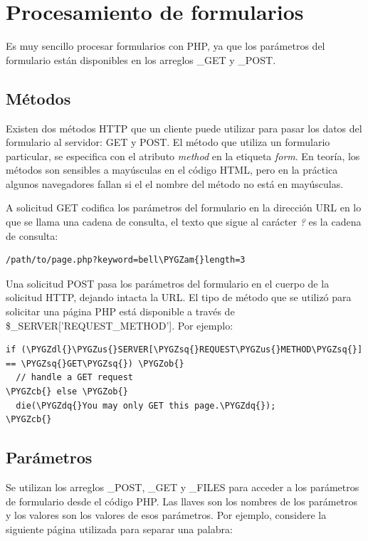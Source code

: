 \documentclass[a5paper,10pt,spanish]{sphinxmanual}
\def\PYGZus{\char`\_}
\def\PYGZob{\char`\{}
\def\PYGZcb{\char`\}}
\def\PYGZam{\char`\&}
\def\PYGZdl{\char`\$}
\def\PYGZsq{\char`\'}
\def\PYGZdq{\char`\"}
\begin{document}
\section{Procesamiento de formularios}
\label{Tutorial2_Formularios.md::doc}\label{Tutorial2_Formularios.md:procesamiento-de-formularios}
Es muy sencillo procesar formularios con PHP, ya que los parámetros del
formulario están disponibles en los arreglos \_GET y \_POST.


\subsection{Métodos}
\label{Tutorial2_Formularios.md:metodos}
Existen dos métodos HTTP que un cliente puede utilizar para pasar los
datos del formulario al servidor: GET y POST. El método que utiliza un
formulario particular, se especifica con el atributo \emph{method} en la
etiqueta \emph{form}. En teoría, los métodos son sensibles a mayúsculas en el
código HTML, pero en la práctica algunos navegadores fallan si el el
nombre del método no está en mayúsculas.

A solicitud GET codifica los parámetros del formulario en la dirección
URL en lo que se llama una cadena de consulta, el texto que sigue al
carácter \emph{?} es la cadena de consulta:

\begin{Verbatim}[commandchars=\\\{\}]
/path/to/page.php?keyword=bell\PYGZam{}length=3
\end{Verbatim}

Una solicitud POST pasa los parámetros del formulario en el cuerpo de la
solicitud HTTP, dejando intacta la URL. El tipo de método que se utilizó
para solicitar una página PHP está disponible a través de
\$\_SERVER{[}'REQUEST\_METHOD'{]}. Por ejemplo:

\begin{Verbatim}[commandchars=\\\{\}]
if (\PYGZdl{}\PYGZus{}SERVER[\PYGZsq{}REQUEST\PYGZus{}METHOD\PYGZsq{}] == \PYGZsq{}GET\PYGZsq{}) \PYGZob{}
  // handle a GET request
\PYGZcb{} else \PYGZob{}
  die(\PYGZdq{}You may only GET this page.\PYGZdq{});
\PYGZcb{}
\end{Verbatim}


\subsection{Parámetros}
\label{Tutorial2_Formularios.md:parametros}
Se utilizan los arreglos \_POST, \_GET y \_FILES para acceder a los
parámetros de formulario desde el código PHP. Las llaves son los nombres
de los parámetros y los valores son los valores de esos parámetros. Por
ejemplo, considere la siguiente página utilizada para separar una
palabra:
\end{document}
